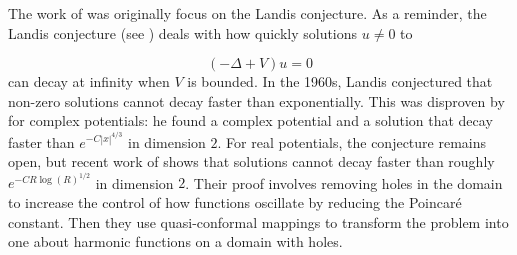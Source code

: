 \documentclass[leqno,11pt,letterpaper, english]{amsart}
\newcommand{\nn}{\nonumber}
\theoremstyle{plain}
\newtheorem{thm}{Theorem}
\theoremstyle{definition}
\numberwithin{equation}{section}
\begin{document}






The work of \cite*{logunov2020landisconjectureexponentialdecay} was originally focus on the Landis conjecture.
	As a reminder, the Landis conjecture (see \cite{Kondratev1991}) deals with how quickly solutions $u \neq 0$ to

	\begin{equation}
		(-\Delta+V)u=0
	\end{equation}
	can decay at infinity when $V$ is bounded.
	In the 1960s, Landis conjectured that non-zero solutions cannot decay faster than exponentially. This was disproven by \cite{Meshkov1992} for complex potentials: he found a complex potential and a solution that decay faster than $e^{-C|x|^{4/3}}$ in dimension $2$. For real potentials, the conjecture remains open, but recent work of \cite*{logunov2020landisconjectureexponentialdecay} shows that solutions cannot decay faster than roughly $e^{-CR\log(R)^{1/2}}$ in dimension $2$.
	Their proof involves removing holes in the domain to increase the control of how functions oscillate by reducing the Poincaré constant. Then they use quasi-conformal mappings to transform the problem into one about harmonic functions on a domain with holes.
\end{document}
